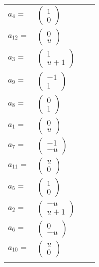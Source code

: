 \documentclass[1p]{elsarticle_modified}
\theoremstyle{definition}
\begin{document}
\begin{tabular}{m{7pt} m{180pt} m{7pt} m{180pt} }
\flushright $a_{4}=$&$\begin{pmatrix}1\\0\end{pmatrix}$ \\
\flushright $a_{12}=$&$\begin{pmatrix}0\\u\end{pmatrix}$ \\
\flushright $a_{3}=$&$\begin{pmatrix}1\\u+1\end{pmatrix}$ \\
\flushright $a_{9}=$&$\begin{pmatrix}-1\\1\end{pmatrix}$ \\
\flushright $a_{8}=$&$\begin{pmatrix}0\\1\end{pmatrix}$ \\
\flushright $a_{1}=$&$\begin{pmatrix}0\\u\end{pmatrix}$ \\
\flushright $a_{7}=$&$\begin{pmatrix}-1\\- u\end{pmatrix}$ \\
\flushright $a_{11}=$&$\begin{pmatrix}u\\0\end{pmatrix}$ \\
\flushright $a_{5}=$&$\begin{pmatrix}1\\0\end{pmatrix}$ \\
\flushright $a_{2}=$&$\begin{pmatrix}- u\\u+1\end{pmatrix}$ \\
\flushright $a_{6}=$&$\begin{pmatrix}0\\- u\end{pmatrix}$ \\
\flushright $a_{10}=$&$\begin{pmatrix}u\\0\end{pmatrix}$\\&\end{tabular}
\end{document}

